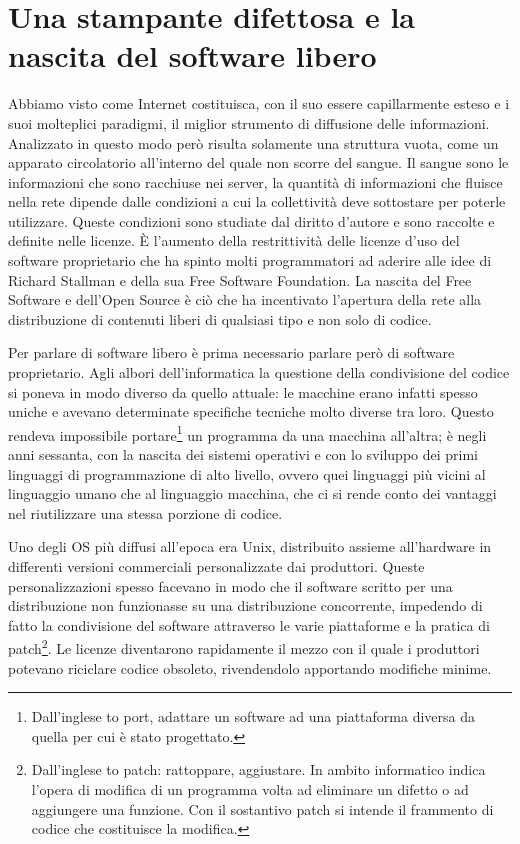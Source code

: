 \chapter{Una stampante difettosa e la nascita del software libero}

Abbiamo visto come Internet costituisca, con il suo essere capillarmente esteso e i suoi
molteplici paradigmi, il miglior strumento di diffusione delle informazioni. Analizzato in questo
modo però risulta solamente una struttura vuota, come un apparato circolatorio all’interno
del quale non scorre del sangue. Il sangue sono le informazioni che sono racchiuse nei
server, la quantità di informazioni che fluisce nella rete dipende dalle condizioni a cui la
collettività deve sottostare per poterle utilizzare. Queste condizioni sono studiate dal diritto
d’autore e sono raccolte e definite nelle licenze. È l’aumento della restrittività delle licenze
d’uso del software proprietario che ha spinto molti programmatori ad aderire alle idee di
Richard Stallman e della sua Free Software Foundation. La nascita del Free Software e
dell’Open Source è ciò che ha incentivato l’apertura della rete alla distribuzione di contenuti
liberi di qualsiasi tipo e non solo di codice.

Per parlare di software libero è prima necessario parlare però di software proprietario.
Agli albori dell’informatica la questione della condivisione del codice si poneva in modo
diverso da quello attuale: le macchine erano infatti spesso uniche e avevano determinate
specifiche tecniche molto diverse tra loro. Questo rendeva impossibile portare\footnote{Dall'inglese to port, adattare un software ad una piattaforma diversa da quella per cui è stato progettato.} un
programma da una macchina all’altra; è negli anni sessanta, con la nascita dei sistemi
operativi e con lo sviluppo dei primi linguaggi di programmazione di alto livello, ovvero quei
linguaggi più vicini al linguaggio umano che al linguaggio macchina, che ci si rende conto
dei vantaggi nel riutilizzare una stessa porzione di codice.

Uno degli OS più diffusi all’epoca era Unix, distribuito assieme all’hardware in
differenti versioni commerciali personalizzate dai produttori. Queste personalizzazioni
spesso facevano in modo che il software scritto per una distribuzione non funzionasse su
una distribuzione concorrente, impedendo di fatto la condivisione del software attraverso le
varie piattaforme e la pratica di patch\footnote{Dall’inglese to patch: rattoppare, aggiustare. In ambito informatico indica l’opera di modifica di un programma volta ad eliminare un
difetto o ad aggiungere una funzione. Con il sostantivo patch si intende il frammento di codice che costituisce la modifica.}. Le licenze diventarono rapidamente il mezzo con il
quale i produttori potevano riciclare codice obsoleto, rivendendolo apportando modifiche
minime.

